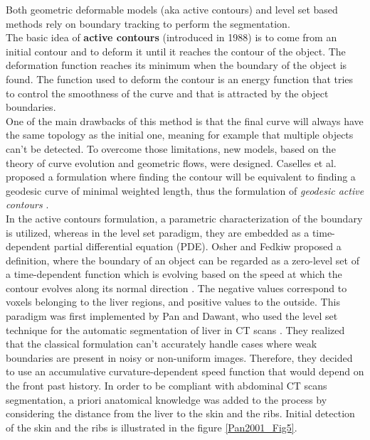 \documentclass[]{article}
\begin{document}
Both geometric deformable models (aka active contours) and level set
based methods rely on boundary tracking to perform the segmentation.\\
The basic idea of \textbf{active contours} (introduced in 1988) is to
come from an initial contour and to deform it until it reaches the
contour of the object. The deformation function reaches its minimum when
the boundary of the object is found. The function used to deform the
contour is an energy function that tries to control the smoothness of
the curve and that is attracted by the object boundaries.\\
One of the main drawbacks of this method is that the final curve will
always have the same topology as the initial one, meaning for example
that multiple objects can't be detected. To overcome those limitations,
new models, based on the theory of curve evolution and geometric flows,
were designed.
Caselles et al. proposed a formulation where finding the contour will be
equivalent to finding a geodesic curve of minimal weighted length, thus
the formulation of \emph{geodesic active contours} \cite{Caselles1997}.\\
In the active contours formulation, a parametric characterization of the
boundary is utilized, whereas in the level set paradigm, they are
embedded as a time-dependent partial differential equation (PDE).
Osher and Fedkiw proposed a definition, where the boundary of an object
can be regarded as a zero-level set of a time-dependent function which
is evolving based on the speed at which the contour evolves along its
normal direction \cite{Osher2003}. The negative values correspond to voxels belonging to
the liver regions, and positive values to the outside. This paradigm was
first implemented by
Pan and Dawant, who used the level set technique for the automatic segmentation of liver
in CT scans \cite{Pan2001}. They realized that the classical formulation can't
accurately handle cases where weak boundaries are present in noisy or
non-uniform images. Therefore, they decided to use an accumulative
curvature-dependent speed function that would depend on the front past
history. In order to be compliant with abdominal CT scans segmentation,
a priori anatomical knowledge was added to the process by considering
the distance from the liver to the skin and the ribs. Initial detection
of the skin and the ribs is illustrated in the figure \ref{Pan2001_Fig5}.
\end{document}
